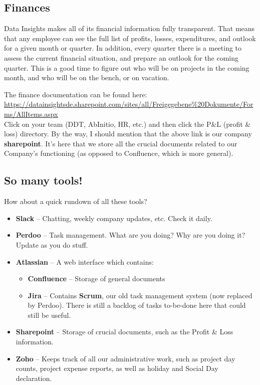 \documentclass[11pt]{report}
\begin{document}
\subsection{Finances}
Data Insights makes all of its financial information fully transparent. That means that any employee can see the full list of profits, losses, expenditures, and outlook for a given month or quarter. In addition, every quarter there is a meeting to assess the current financial situation, and prepare an outlook for the coming quarter. This is a good time to figure out who will be on projects in the coming month, and who will be on the bench, or on vacation.

The finance documentation can be found here:\\
\href{https://datainsightsde.sharepoint.com/sites/all/Freigegebene\%20Dokumente/Forms/AllItems.aspx}{\scriptsize https://datainsightsde.sharepoint.com/sites/all/Freigegebene\%20Dokumente/Forms/AllItems.aspx}\\
Click on your team (DDT, AbInitio, HR, etc.) and then click the P\&L (profit \& loss) directory. By the way, I should mention that the above link is our company \textbf{sharepoint}. It's here that we store all the crucial documents related to our Company's functioning (as opposed to Confluence, which is more general).

\subsection{So many tools!}
How about a quick rundown of all these tools?
\begin{itemize}
\item \textbf{Slack} -- Chatting, weekly company updates, etc. Check it daily.
\item \textbf{Perdoo} -- Task management. What are you doing? Why are you doing it? Update as you do stuff.
\item \textbf{Atlassian} -- A web interface which contains:
\begin{itemize}
\item \textbf{Confluence} -- Storage of general documents
\item \textbf{Jira} -- Contains \textbf{Scrum}, our old task management system (now replaced by Perdoo). There is still a backlog of tasks to-be-done here that could still be useful.
\end{itemize}
\item \textbf{Sharepoint} -- Storage of crucial documents, such as the Profit \& Loss information.
\item \textbf{Zoho} -- Keeps track of all our administrative work, such as project day counts, project expense reports, as well as holiday and Social Day declaration.
\end{itemize}
\end{document}

